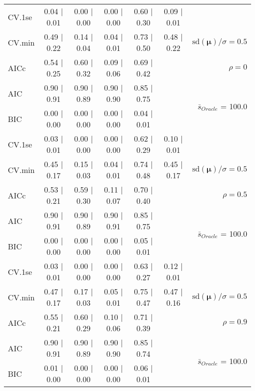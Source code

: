 \begin{table}
\begin{center}
\begin{tabular}{l*{5}{c}|r}
 \hline 
CV.1se & 0.04 $\mid$ 0.01 & 0.00 $\mid$ 0.00 & 0.00 $\mid$ 0.00 & 0.60 $\mid$ 0.30 & 0.09 $\mid$ 0.01 & \\
CV.min & 0.49 $\mid$ 0.22 & 0.14 $\mid$ 0.04 & 0.04 $\mid$ 0.01 & 0.73 $\mid$ 0.50 & 0.48 $\mid$ 0.22 &  $\mathrm{sd}(\mathbf{\mu})/\sigma=0.5$ \\
AICc & 0.54 $\mid$ 0.25 & 0.60 $\mid$ 0.32 & 0.09 $\mid$ 0.06 & 0.69 $\mid$ 0.42 & & $\rho=0$ \\
AIC & 0.90 $\mid$ 0.91 & 0.90 $\mid$ 0.89 & 0.90 $\mid$ 0.90 & 0.85 $\mid$ 0.75 & &  \multirow{2}{*}{$\bar{s}_{Oracle}$ = 100.0} \\
BIC & 0.00 $\mid$ 0.00 & 0.00 $\mid$ 0.00 & 0.00 $\mid$ 0.00 & 0.04 $\mid$ 0.01 & &  \\
 \hline 
CV.1se & 0.03 $\mid$ 0.01 & 0.00 $\mid$ 0.00 & 0.00 $\mid$ 0.00 & 0.62 $\mid$ 0.29 & 0.10 $\mid$ 0.01 & \\
CV.min & 0.45 $\mid$ 0.17 & 0.15 $\mid$ 0.03 & 0.04 $\mid$ 0.01 & 0.74 $\mid$ 0.48 & 0.45 $\mid$ 0.17 &  $\mathrm{sd}(\mathbf{\mu})/\sigma=0.5$ \\
AICc & 0.53 $\mid$ 0.21 & 0.59 $\mid$ 0.30 & 0.11 $\mid$ 0.07 & 0.70 $\mid$ 0.40 & & $\rho=0.5$ \\
AIC & 0.90 $\mid$ 0.91 & 0.90 $\mid$ 0.89 & 0.90 $\mid$ 0.91 & 0.85 $\mid$ 0.75 & &  \multirow{2}{*}{$\bar{s}_{Oracle}$ = 100.0} \\
BIC & 0.00 $\mid$ 0.00 & 0.00 $\mid$ 0.00 & 0.00 $\mid$ 0.00 & 0.05 $\mid$ 0.01 & &  \\
 \hline 
CV.1se & 0.03 $\mid$ 0.01 & 0.00 $\mid$ 0.00 & 0.00 $\mid$ 0.00 & 0.63 $\mid$ 0.27 & 0.12 $\mid$ 0.01 & \\
CV.min & 0.47 $\mid$ 0.17 & 0.17 $\mid$ 0.03 & 0.05 $\mid$ 0.01 & 0.75 $\mid$ 0.47 & 0.47 $\mid$ 0.16 &  $\mathrm{sd}(\mathbf{\mu})/\sigma=0.5$ \\
AICc & 0.55 $\mid$ 0.21 & 0.60 $\mid$ 0.29 & 0.10 $\mid$ 0.06 & 0.71 $\mid$ 0.39 & & $\rho=0.9$ \\
AIC & 0.90 $\mid$ 0.91 & 0.90 $\mid$ 0.89 & 0.90 $\mid$ 0.90 & 0.85 $\mid$ 0.74 & &  \multirow{2}{*}{$\bar{s}_{Oracle}$ = 100.0} \\
BIC & 0.01 $\mid$ 0.00 & 0.00 $\mid$ 0.00 & 0.00 $\mid$ 0.00 & 0.06 $\mid$ 0.01 & &  \\
 \hline 
\end{tabular}
\end{center}
\vspace{-1cm}
\end{table}




